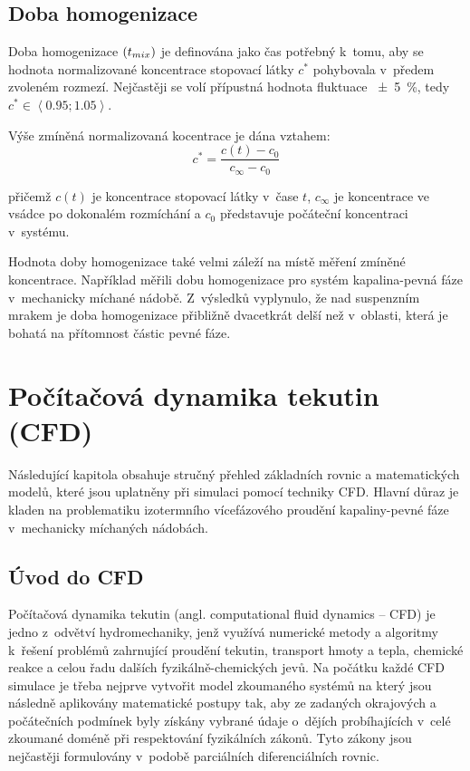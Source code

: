 \subsection{Doba homogenizace}
Doba homogenizace $\left( t_{mix} \right)$ je definována jako čas potřebný k~tomu, aby se hodnota normalizované koncentrace stopovací látky $c^{*}$ pohybovala v~předem zvoleném rozmezí. Nejčastěji se volí přípustná hodnota fluktuace \SI{\pm 5}{\percent}, tedy $c^{*} \in \left<\num{0.95};\num{1.05}\right>$. 

Výše zmíněná normalizovaná kocentrace je dána vztahem:
\begin{equation}
	c^{*} = \frac{c(t) - c_{0}}{c_{\infty} - c_{0}}
	\label{eq:bezkon}
\end{equation}

\noindent přičemž $c(t)$ je koncentrace stopovací látky v~čase $t$, $c_{\infty}$ je koncentrace ve vsádce po dokonalém rozmíchání a $c_{0}$ představuje počáteční koncentraci v~systému.  

Hodnota doby homogenizace také velmi záleží na místě měření zmíněné koncentrace. Například \citet{buj99} měřili dobu homogenizace pro systém kapalina-pevná fáze v~mechanicky míchané nádobě. Z~výsledků vyplynulo, že nad suspenzním mrakem je doba homogenizace přibližně dvacetkrát delší než v~oblasti, která je bohatá na přítomnost částic pevné fáze.

\section{Počítačová dynamika tekutin (CFD)}
Následující kapitola obsahuje stručný přehled základních rovnic a matematických modelů, které jsou uplatněny při simulaci pomocí techniky CFD. Hlavní důraz je kladen na problematiku izotermního vícefázového proudění kapaliny-pevné fáze v~mechanicky míchaných nádobách.

\subsection{Úvod do CFD}
Počítačová dynamika tekutin (angl. computational fluid dynamics -- CFD) je jedno z~odvětví hydromechaniky, jenž využívá numerické metody a algoritmy k~řešení prob\-lé\-mů zahrnující proudění tekutin, transport hmoty a tepla, chemické reakce a celou řadu dalších fyzikálně-chemických jevů. Na počátku každé CFD simulace je třeba nejprve vytvořit model zkoumaného systémů na který jsou následně aplikovány matematické postupy tak, aby ze zadaných okrajových a počátečních podmínek byly získány vybrané údaje o~dějích probíhajících v~celé zkoumané doméně při respektování fyzikálních zákonů. Tyto zákony jsou nejčastěji formulovány v~podobě parciálních diferenciálních rovnic. 


